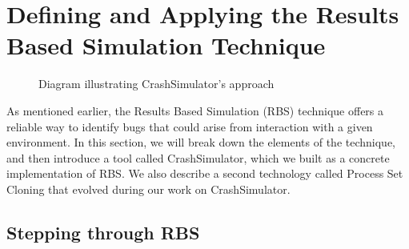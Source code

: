 \section{Defining and Applying the Results Based Simulation Technique}
\label{SEC:approach}

\begin{figure}[t]
  \center{}
  \caption{Diagram illustrating CrashSimulator's approach}
  \label{figure:approach}
\end{figure}

As mentioned earlier,
the Results Based Simulation (RBS) technique
offers a reliable way to identify bugs
that could arise from interaction with a given environment.
In this section,
we will break down the elements of the technique,
and then introduce a tool called CrashSimulator,
which we built as a concrete implementation of RBS.
We also describe a second technology
called Process Set Cloning
that evolved during our work on CrashSimulator.


\subsection{Stepping through RBS}

